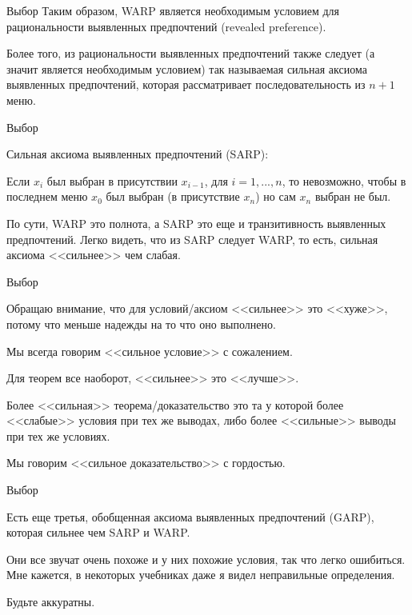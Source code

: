 \documentclass{beamer}
\begin{document}
\begin{frame}{Выбор}
Таким образом, WARP является необходимым условием для рациональности выявленных предпочтений (\alert{revealed preference}). 

Более того, из рациональности выявленных предпочтений также следует (а значит является необходимым условием) так называемая сильная аксиома выявленных предпочтений, которая рассматривает последовательность из $n+1$ меню.

\end{frame}

\begin{frame}{Выбор}

\begin{definition} 
\alert{Сильная аксиома выявленных предпочтений} (SARP): 

Если $x_{i}$ был выбран в присутствии $x_{i-1}$, для $i = 1, ..., n$, то невозможно, чтобы в последнем меню $x_0$ был выбран (в присутствие $x_n$) но сам $x_n$ выбран не был.
\end{definition}

По сути, WARP это полнота, а SARP это еще и транзитивность выявленных предпочтений. Легко видеть, что из SARP следует WARP, то есть, сильная аксиома <<сильнее>> чем слабая.

\end{frame}

\begin{frame}{Выбор}

Обращаю внимание, что для условий/аксиом <<сильнее>> это <<хуже>>, потому что меньше надежды на то что оно выполнено. 

Мы всегда говорим <<сильное условие>> с сожалением.

Для теорем все наоборот, <<сильнее>> это <<лучше>>.

Более <<сильная>> теорема/доказательство это та у которой более <<слабые>> условия при тех же выводах, либо более <<сильные>> выводы при тех же условиях.

Мы говорим <<сильное доказательство>> с гордостью.

\end{frame}


\begin{frame}{Выбор}

Есть еще третья, обобщенная аксиома выявленных предпочтений (GARP), которая сильнее чем SARP и WARP. 

Они все звучат очень похоже и у них похожие условия, так что легко ошибиться. Мне кажется, в некоторых учебниках даже я видел неправильные определения.

Будьте аккуратны.

\end{frame}
\end{document}
